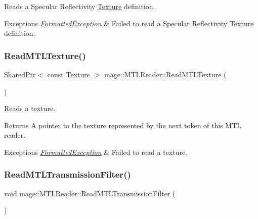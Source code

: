 Reads a Specular Reflectivity \hyperlink{classmage_1_1_texture}{Texture} definition.


\begin{DoxyExceptions}{Exceptions}
{\em \hyperlink{structmage_1_1_formatted_exception}{Formatted\+Exception}} & Failed to read a Specular Reflectivity \hyperlink{classmage_1_1_texture}{Texture} definition. \\
\hline
\end{DoxyExceptions}
\hypertarget{classmage_1_1_m_t_l_reader_a36dd3bbfd989698c9caeacc059d03e69}{}\label{classmage_1_1_m_t_l_reader_a36dd3bbfd989698c9caeacc059d03e69} 
\subsubsection{\texorpdfstring{Read\+M\+T\+L\+Texture()}{ReadMTLTexture()}}
{\footnotesize\ttfamily \hyperlink{namespacemage_a1e01ae66713838a7a67d30e44c67703e}{Shared\+Ptr}$<$ const \hyperlink{classmage_1_1_texture}{Texture} $>$ mage\+::\+M\+T\+L\+Reader\+::\+Read\+M\+T\+L\+Texture (\begin{DoxyParamCaption}{ }\end{DoxyParamCaption})\hspace{0.3cm}{\ttfamily [private]}}

Reads a texture.

\begin{DoxyReturn}{Returns}
A pointer to the texture represented by the next token of this M\+TL reader. 
\end{DoxyReturn}

\begin{DoxyExceptions}{Exceptions}
{\em \hyperlink{structmage_1_1_formatted_exception}{Formatted\+Exception}} & Failed to read a texture. \\
\hline
\end{DoxyExceptions}
\hypertarget{classmage_1_1_m_t_l_reader_a4d5819606b5ea81862852587b2e1511b}{}\label{classmage_1_1_m_t_l_reader_a4d5819606b5ea81862852587b2e1511b} 
\subsubsection{\texorpdfstring{Read\+M\+T\+L\+Transmission\+Filter()}{ReadMTLTransmissionFilter()}}
{\footnotesize\ttfamily void mage\+::\+M\+T\+L\+Reader\+::\+Read\+M\+T\+L\+Transmission\+Filter (\begin{DoxyParamCaption}{ }\end{DoxyParamCaption})\hspace{0.3cm}{\ttfamily [private]}}

